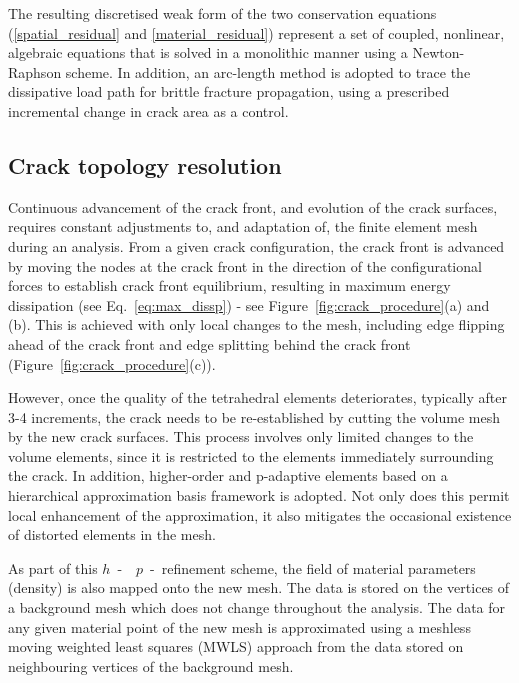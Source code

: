 \documentclass[onecolumn]{svjour3}
\begin{document}
The resulting discretised weak form of the two conservation equations (\ref{spatial_residual} and \ref{material_residual}) represent a
set of coupled, nonlinear, algebraic equations that is solved in a monolithic manner using a Newton-Raphson scheme.
In addition, an arc-length method is adopted to trace the dissipative load path for brittle fracture propagation, using a prescribed incremental change in crack area as a control.

\subsection{Crack topology resolution}
\label{sec:crack_topology}
% 
Continuous advancement of the crack front, and evolution of the crack surfaces, requires constant adjustments to, and adaptation of, the finite element mesh during an analysis. 
From a given crack configuration, the crack front is advanced by moving the nodes at the crack front in the direction of the configurational forces to establish crack front equilibrium, resulting in maximum energy dissipation (see Eq.~\ref{eq:max_dissp}) - see Figure~\ref{fig:crack_procedure}(a) and (b). This is achieved with only local changes to the mesh, including edge flipping ahead of the crack front and edge splitting behind the crack front (Figure~\ref{fig:crack_procedure}(c)).

However, once the quality of the tetrahedral elements deteriorates, typically after 3-4 increments, the crack needs to be re-established by cutting the volume mesh by the new crack surfaces. This process involves only limited changes to the volume elements, since it is restricted to the elements immediately surrounding the crack. In addition, higher-order and p-adaptive elements based on a hierarchical approximation basis framework \citep{mofemJoss2020,Ainsworth2003} is adopted. Not only does this permit local enhancement of the approximation, it also mitigates the occasional existence of distorted elements in the mesh. 

As part of this $h$~-~~$p$~-~refinement scheme, the field of material parameters (density) is also mapped onto the new mesh. The data is stored on the vertices of a background mesh which does not change throughout the analysis. The data for any given material point of the new mesh is approximated using a meshless moving weighted least squares (MWLS) approach from the data stored on neighbouring vertices of the background mesh. 
\end{document}
